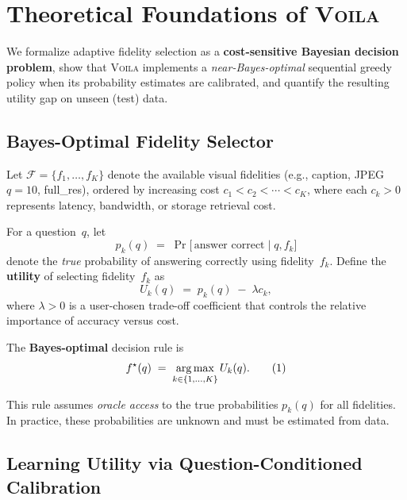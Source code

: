 \section{Theoretical Foundations of \textsc{Voila}}
\label{sec:theory}

We formalize adaptive fidelity selection as a \textbf{cost-sensitive Bayesian decision problem},
show that \textsc{Voila} implements a \emph{near-Bayes-optimal} sequential greedy policy when its
probability estimates are calibrated, and quantify the resulting utility gap on unseen
(test) data.

\vspace{-0.3em}
\subsection{Bayes-Optimal Fidelity Selector}
\label{sec:bayes_optimal}

Let $\mathcal{F}=\{f_1,\dots,f_K\}$ denote the
available visual fidelities
(e.g., caption, JPEG $q{=}10$, full\_res),
ordered by increasing cost $c_1 < c_2 < \cdots < c_K$, where each $c_k > 0$ represents
latency, bandwidth, or storage retrieval cost.

For a question~$q$, let
%
\[
p_k(q)\;=\;\Pr\!\bigl[\,\text{answer correct} \mid q, f_k\bigr]
\]
%
denote the \emph{true} probability of answering correctly using fidelity~$f_k$.
Define the \textbf{utility} of selecting fidelity~$f_k$ as
\[
U_k(q)\;=\;p_k(q)\;-\;\lambda c_k,
\]
where $\lambda > 0$ is a user-chosen trade-off coefficient that controls the relative importance
of accuracy versus cost.

The \textbf{Bayes-optimal} decision rule is
\begin{equation}
f^\star(q)\;=\;\operatorname*{arg\,max}_{k \in \{1,\dots,K\}} U_k(q).
\tag{1}
\label{eq:bayes_optimal}
\end{equation}

This rule assumes \emph{oracle access} to the true probabilities $p_k(q)$ for all fidelities.
In practice, these probabilities are unknown and must be estimated from data.

\vspace{-0.3em}
\subsection{Learning Utility via Question-Conditioned Calibration}
\label{sec:calibration}

